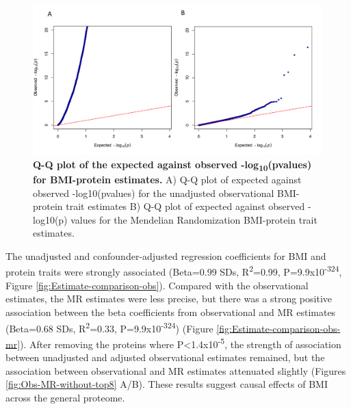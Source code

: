 \documentclass[11pt,twoside]{bristolthesis}
\begin{document}
\begin{figure}

{\centering \includegraphics[width=0.95\linewidth]{figure/BMI_protein_INTERVAL/QQ_obs_MR} 

}

\caption[Q-Q plot of the expected against observed -log\textsubscript{10}(pvalues) for BMI-protein estimates]{\textbf{Q-Q plot of the expected against observed -log\textsubscript{10}(pvalues) for BMI-protein estimates.} A) Q-Q plot of expected against observed -log10(pvalues) for the unadjusted observational BMI-protein trait estimates B) Q-Q plot of expected against observed -log10(p) values for the Mendelian Randomization BMI-protein trait estimates.}\label{fig:QQ-obs-MR}
\end{figure}
The unadjusted and confounder-adjusted regression coefficients for BMI and protein traits were strongly associated (Beta=0.99 SDs, R\textsuperscript{2}=0.99, P=9.9x10\textsuperscript{-324}, Figure \ref{fig:Estimate-comparison-obs}). Compared with the observational estimates, the MR estimates were less precise, but there was a strong positive association between the beta coefficients from observational and MR estimates (Beta=0.68 SDs, R\textsuperscript{2}=0.33, P=9.9x10\textsuperscript{-324}) (Figure \ref{fig:Estimate-comparison-obs-mr}). After removing the proteins where P\textless1.4x10\textsuperscript{-5}, the strength of association between unadjusted and adjusted observational estimates remained, but the association between observational and MR estimates attenuated slightly (Figures \ref{fig:Obs-MR-without-top8} A/B). These results suggest causal effects of BMI across the general proteome.
\end{document}
